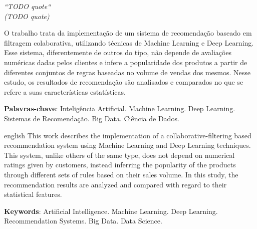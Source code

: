 \documentclass[
	12pt,	%
	openright,			%
	oneside,            %
	a4paper,			%
	english,			%
	french,				%
	spanish,			%
	brazil				%
]{abntex2}
\begin{document}
\begin{epigrafe}
    \vspace*{\fill}
	\begin{flushright}
		\textit{``TODO quote``\\
		(TODO quote)}
	\end{flushright}
\end{epigrafe}


\setlength{\absparsep}{18pt} 
\begin{resumo}

O trabalho trata da implementação de um sistema de recomendação baseado em filtragem colaborativa, utilizando técnicas de Machine Learning e Deep Learning. Esse sistema, diferentemente de outros do tipo, não depende de avaliações numéricas dadas pelos clientes e infere a popularidade dos produtos a partir de diferentes conjuntos de regras baseadas no volume de vendas dos mesmos. Nesse estudo, os resultados de recomendação são analisados e comparados no que se refere a suas características estatísticas.

 \textbf{Palavras-chave}: Inteligência Artificial. Machine Learning. Deep Learning. Sistemas de Recomendação. Big Data. Ciência de Dados.
\end{resumo}

\begin{resumo}[Abstract]
 \begin{otherlanguage*}{english}
This work describes the implementation of a collaborative-filtering based recommendation system using Machine Learning and Deep Learning techniques. This system, unlike others of the same type, does not depend on numerical ratings given by customers, instead inferring the popularity of the products through different sets of rules based on their sales volume. In this study, the recommendation results are analyzed and compared with regard to their statistical features.
   \vspace{\onelineskip}
 
   \noindent 
   \textbf{Keywords}: Artificial Intelligence. Machine Learning. Deep Learning. Recommendation Systems. Big Data. Data Science.
 \end{otherlanguage*}
\end{resumo}

\end{document}
